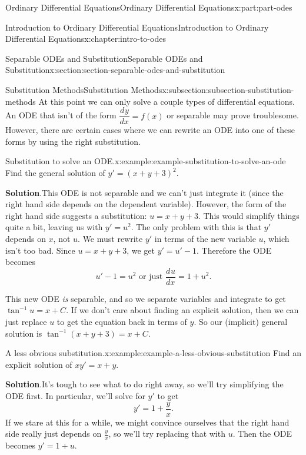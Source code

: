 \documentclass[twoside,10pt,]{book}
\newcommand{\blocktitlefont}{\relax}
\numberwithin{equation}{part}
\providecommand{\dv}[3][]{\dfrac{d^{#1} #2}{d #3^{#1}}}
\begin{document}
\begin{partptx}{Ordinary Differential Equations}{}{Ordinary Differential Equations}{}{}{x:part:part-odes}
\begin{chapterptx}{Introduction to Ordinary Differential Equations}{}{Introduction to Ordinary Differential Equations}{}{}{x:chapter:intro-to-odes}
\begin{sectionptx}{Separable ODEs and Substitution}{}{Separable ODEs and Substitution}{}{}{x:section:section-separable-odes-and-substitution}
\typeout{************************************************}
%
\begin{subsectionptx}{Substitution Methods}{}{Substitution Methods}{}{}{x:subsection:subsection-substitution-methods}
At this point we can only solve a couple types of differential equations. An ODE that isn't of the form \(\dv{y}{x} = f(x)\) or separable may prove troublesome. However, there are certain cases where we can rewrite an ODE into one of these forms by using the right substitution.%
\begin{example}{Substitution to solve an ODE.}{x:example:example-substitution-to-solve-an-ode}%
Find the general solution of \(y' = (x+y+3)^{2}\).%
\par\smallskip%
\noindent\textbf{\blocktitlefont Solution}.\hypertarget{g:solution:idp105548816265760}{}\quad{}This ODE is not separable and we can't just integrate it (since the right hand side depends on the dependent variable). However, the form of the right hand side suggests a substitution: \(u = x+y+3\). This would simplify things quite a bit, leaving us with \(y'=u^{2}\). The only problem with this is that \(y'\) depends on \(x\), not \(u\). We must rewrite \(y'\) in terms of the new variable \(u\), which isn't too bad. Since \(u = x+y+3\), we get \(y' = u'-1\). Therefore the ODE becomes%
\begin{equation*}
u'-1 = u^{2}\text{ or just }\dv{u}{x} = 1+u^{2}.
\end{equation*}
%
\par
This new ODE \emph{is} separable, and so we separate variables and integrate to get \(\tan^{-1}u = x+C\). If we don't care about finding an explicit solution, then we can just replace \(u\) to get the equation back in terms of \(y\). So our (implicit) general solution is \(\tan^{-1}(x+y+3) = x+C\).%
\end{example}
\begin{example}{A less obvious substitution.}{x:example:example-a-less-obvious-substitution}%
Find an explicit solution of \(xy'=x+y\).%
\par\smallskip%
\noindent\textbf{\blocktitlefont Solution}.\hypertarget{g:solution:idp105548816273440}{}\quad{}It's tough to see what to do right away, so we'll try simplifying the ODE first. In particular, we'll solve for \(y'\) to get%
\begin{equation*}
y' = 1+\frac{y}{x}.
\end{equation*}
If we stare at this for a while, we might convince ourselves that the right hand side really just depends on \(\frac{y}{x}\), so we'll try replacing that with \(u\). Then the ODE becomes \(y'=1+u\).%

\end{example}
\end{subsectionptx}
\end{sectionptx}
\end{chapterptx}
\end{partptx}
\end{document}
